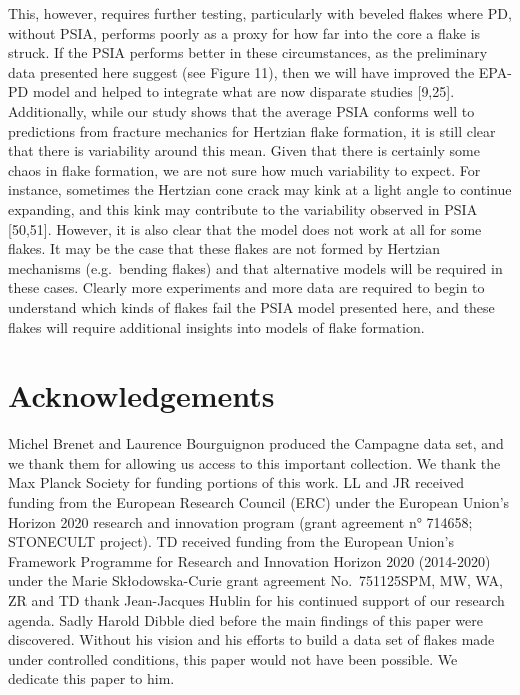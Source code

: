 \documentclass[10pt,letterpaper]{article}
\begin{document}
This, however, requires further testing, particularly with beveled
flakes where PD, without PSIA, performs poorly as a proxy for how far
into the core a flake is struck. If the PSIA performs better in these
circumstances, as the preliminary data presented here suggest (see
Figure 11), then we will have improved the EPA-PD model and helped to
integrate what are now disparate studies {[}9,25{]}. Additionally, while
our study shows that the average PSIA conforms well to predictions from
fracture mechanics for Hertzian flake formation, it is still clear that
there is variability around this mean. Given that there is certainly
some chaos in flake formation, we are not sure how much variability to
expect. For instance, sometimes the Hertzian cone crack may kink at a
light angle to continue expanding, and this kink may contribute to the
variability observed in PSIA {[}50,51{]}. However, it is also clear that
the model does not work at all for some flakes. It may be the case that
these flakes are not formed by Hertzian mechanisms (e.g.~bending flakes)
and that alternative models will be required in these cases. Clearly
more experiments and more data are required to begin to understand which
kinds of flakes fail the PSIA model presented here, and these flakes
will require additional insights into models of flake formation.

\hypertarget{acknowledgements}{%
\section{Acknowledgements}\label{acknowledgements}}

Michel Brenet and Laurence Bourguignon produced the Campagne data set,
and we thank them for allowing us access to this important collection.
We thank the Max Planck Society for funding portions of this work. LL
and JR received funding from the European Research Council (ERC) under
the European Union's Horizon 2020 research and innovation program (grant
agreement n° 714658; STONECULT project). TD received funding from the
European Union's Framework Programme for Research and Innovation Horizon
2020 (2014-2020) under the Marie Skłodowska-Curie grant agreement
No.~751125SPM, MW, WA, ZR and TD thank Jean-Jacques Hublin for his
continued support of our research agenda. Sadly Harold Dibble died
before the main findings of this paper were discovered. Without his
vision and his efforts to build a data set of flakes made under
controlled conditions, this paper would not have been possible. We
dedicate this paper to him.
\end{document}
